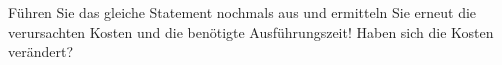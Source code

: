     \item Führen Sie das gleiche Statement nochmals aus und ermitteln Sie erneut die verursachten Kosten und die benötigte Ausführungszeit! Haben sich die Kosten verändert?
